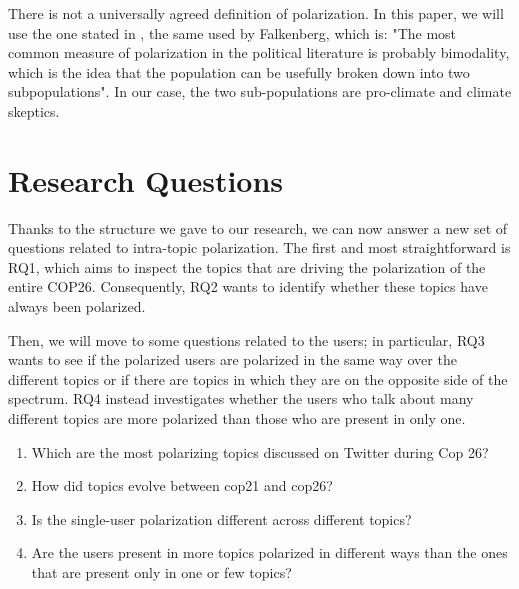 There is not a universally agreed definition of polarization. In this paper, we will use the one stated in \cite{bramson_understanding_2017}, the same used by Falkenberg, which is: "The most common measure of polarization in the political literature is probably bimodality, which is the idea that the population can be usefully broken down into two subpopulations". 
In our case, the two sub-populations are pro-climate and climate skeptics.



\section{Research Questions}
Thanks to the structure we gave to our research, we can now answer a new set of questions related to intra-topic polarization. The first and most straightforward is RQ1, which aims to inspect the topics that are driving the polarization of the entire COP26. Consequently, RQ2 wants to identify whether these topics have always been polarized.

Then, we will move to some questions related to the users; in particular, RQ3 wants to see if the polarized users are polarized in the same way over the different topics or if there are topics in which they are on the opposite side of the spectrum. RQ4 instead investigates whether the users who talk about many different topics are more polarized than those who are present in only one.



\begin{enumerate}
    \item  Which are the most polarizing topics discussed on Twitter during Cop 26?
    \item How did topics evolve between cop21 and cop26?
    \item Is the single-user polarization different across different topics? 
    \item Are the users present in more topics polarized in different ways than the ones that are present only in one or few topics?

\end{enumerate}







